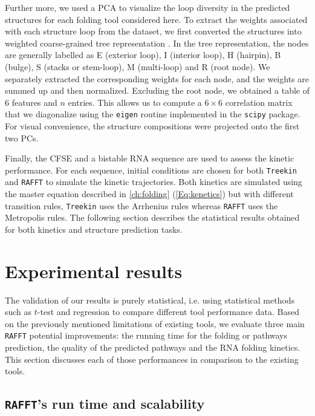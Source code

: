 Further more, we used a \ac{PCA} to visualize the loop diversity in the predicted structures for each folding tool considered here. To extract the weights associated with each structure loop from the dataset, we first converted the structures into weighted coarse-grained tree representation \cite{shapiro1990comparing}. In the tree representation, the nodes are generally labelled as E (exterior loop), I (interior loop), H (hairpin), B (bulge), S (stacks or stem-loop), M (multi-loop) and R (root node). We separately extracted the corresponding weights for each node, and the weights are summed up and then normalized. Excluding the root node, we obtained a table of $6$ features and \(n\) entries. This allows us to compute a \(6\times 6\) correlation matrix that we diagonalize using the \texttt{eigen} routine implemented in the \texttt{scipy} package. For visual convenience, the structure compositions were projected onto the first two \acp{PC}. 

Finally, the \ac{CFSE} and a bistable \ac{RNA} sequence are used to assess the kinetic performance. For each sequence, initial conditions are chosen for both \texttt{Treekin} and \texttt{RAFFT} to simulate the kinetic trajectories. Both kinetics are simulated using the master equation described in \autoref{ch:folding} (\autoref{Eq:kenetics}) but with different transition rules, \texttt{Treekin} uses the Arrhenius rules whereas \texttt{RAFFT} uses the Metropolis rules. The following section describes the statistical results obtained for both kinetics and structure prediction tasks. 

\section{Experimental results }

The validation of our results is purely statistical, i.e. using statistical methods such as $t$-test and regression to compare different tool performance data. Based on the previously mentioned limitations of existing tools, we evaluate three main \texttt{RAFFT} potential improvements: the running time for the folding or pathways prediction, the quality of the predicted pathways and the \ac{RNA} folding kinetics. This section discusses each of those performances in comparison to the existing tools. 

\subsection{ \texttt{RAFFT}'s run time and scalability}

